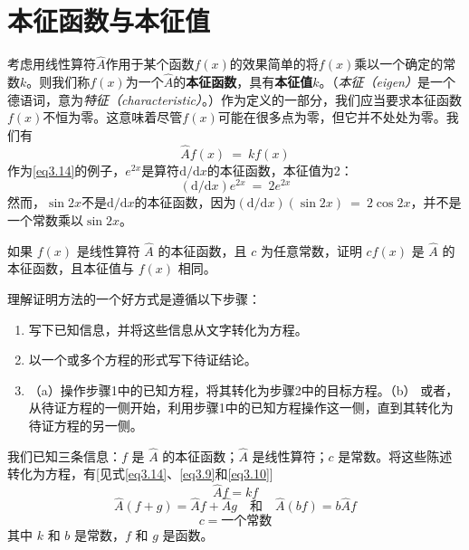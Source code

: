 \documentclass[12pt,a4paper,openany]{ctexbook}
\begin{document}
\section{本征函数与本征值}
\begin{flushleft}
    \setlength{\parindent}{2em}
考虑用线性算符$\hat{A}$作用于某个函数$f(x)$的效果简单的将$f(x)$乘以一个确定的常数$k$。则我们称$f(x)$为一个$\hat{A}$的\textbf{本征函数}，具有\textbf{本征值}$k$。（\textit{本征（eigen）}是一个德语词，意为\textit{特征（characteristic）}。）作为定义的一部分，我们应当要求本征函数$f(x)$不恒为零。这意味着尽管$f(x)$可能在很多点为零，但它并不处处为零。我们有
\begin{equation}
    \boxed{\hat{A}f(x)\ =\ kf(x)}
    \label{eq3.14}
\end{equation}
作为\eqref{eq3.14}的例子，$e^{2x}$是算符$\mathrm{d}/\mathrm{d}x$的本征函数，本征值为2：
\begin{equation*}
    (\mathrm{d}/\mathrm{d}x)e^{2x}\ =\ 2e^{2x}
\end{equation*}
然而，$\sin2x$不是$\mathrm{d}/\mathrm{d}x$的本征函数，因为$(\mathrm{d}/\mathrm{d}x)(\sin2x)\ =\ 2\cos2x$，并不是一个常数乘以$\sin2x$。

\begin{examplebox}
    \setlength{\parindent}{2em}
如果 \(f(x)\) 是线性算符 \(\hat{A}\) 的本征函数，且 \(c\) 为任意常数，证明 \(cf(x)\) 是 \(\hat{A}\) 的本征函数，且本征值与 \(f(x)\) 相同。

理解证明方法的一个好方式是遵循以下步骤：
\begin{enumerate}
\item 写下已知信息，并将这些信息从文字转化为方程。
\item 以一个或多个方程的形式写下待证结论。
\item （a）操作步骤1中的已知方程，将其转化为步骤2中的目标方程。（b） 或者，从待证方程的一侧开始，利用步骤1中的已知方程操作这一侧，直到其转化为待证方程的另一侧。
\end{enumerate}

我们已知三条信息：\(f\) 是 \(\hat{A}\) 的本征函数；\(\hat{A}\) 是线性算符；\(c\) 是常数。将这些陈述转化为方程，有[见式\eqref{eq3.14}、\eqref{eq3.9}和\eqref{eq3.10}]
\begin{equation}
    \hat{A}f = kf
    \label{eq3.15}
\end{equation}
\begin{equation}
    \hat{A}(f + g) = \hat{A}f + \hat{A}g \quad \text{和} \quad \hat{A}(bf) = b\hat{A}f
    \label{eq3.16}
\end{equation}
\[
c = \text{一个常数}
\]
其中 \(k\) 和 \(b\) 是常数，\(f\) 和 \(g\) 是函数。


\end{examplebox}
\end{flushleft}
\end{document}
